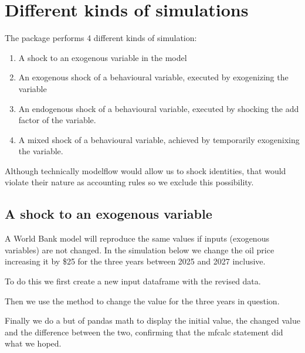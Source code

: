 \documentclass[letterpaper,10pt,english]{jupyterBook}
\begin{document}
\section{Different kinds of simulations}
\label{\detokenize{content/06_WBModels/ScenarioAnalysis:different-kinds-of-simulations}}
\sphinxAtStartPar
The  package performs 4 different kinds of simulation:
\begin{enumerate}
%
\item {} 
\sphinxAtStartPar
A shock to an exogenous variable in the model

\item {} 
\sphinxAtStartPar
An exogenous shock of a behavioural variable, executed by exogenizing the variable

\item {} 
\sphinxAtStartPar
An endogenous shock of a behavioural variable, executed by shocking the add factor of the variable.

\item {} 
\sphinxAtStartPar
A mixed shock of a behavioural variable, achieved by temporarily exogenixing the variable.

\end{enumerate}

\sphinxAtStartPar
Although technically modelflow would allow us to shock identities, that would violate their nature as accounting rules so we exclude this possibility.


\subsection{A shock to an exogenous variable}
\label{\detokenize{content/06_WBModels/ScenarioAnalysis:a-shock-to-an-exogenous-variable}}
\sphinxAtStartPar
A World Bank model will reproduce the same values if inputs (exogenous variables) are not changed.  In the simulation below we change the oil price increasing it by \$25 for the three years between 2025 and 2027 inclusive.

\sphinxAtStartPar
To do this we first create a new input dataframe with the revised data.

\sphinxAtStartPar
Then we use the  method to change the value for the three years in question.

\sphinxAtStartPar
Finally we do a but of pandas math to display the initial value, the changed value and the difference between the two, confirming that the mfcalc statement did what we hoped.
\end{document}
